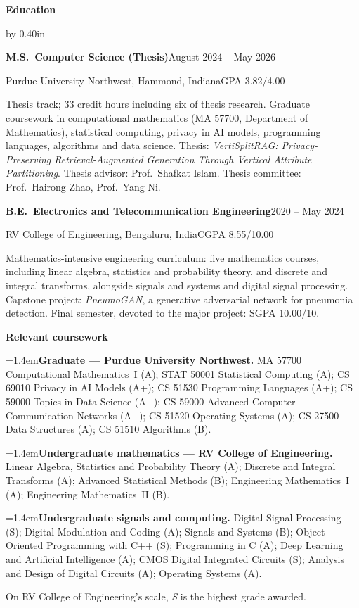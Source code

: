 \documentclass[10pt]{article}
\newcommand{\cvsection}[1]{%
  \vspace{8pt}%
  {\fontsize{11pt}{13pt}\selectfont\textbf{#1}}%
  \par\nobreak\vspace{4pt}%
}
\newenvironment{cvindent}{\par\advance\leftskip by 0.40in}{\par}
\newcommand{\cvrow}[2]{\noindent #1\hfill #2\par}
\newcommand{\cvdesc}[1]{\par #1\par\vspace{5.5pt}}
\newcommand{\cvline}[1]{\par\noindent #1\par\vspace{4pt}}
\newcommand{\cvlab}[2]{\par\noindent\hangindent=1.4em\hangafter=1\textbf{#1} #2\par\vspace{4pt}}
\begin{document}
\cvsection{Education}
\begin{cvindent}

\cvrow{\textbf{M.S.\ Computer Science (Thesis)}}{August 2024 -- May 2026}
\cvrow{Purdue University Northwest, Hammond, Indiana}{GPA 3.82/4.00}
\cvdesc{Thesis track; 33 credit hours including six of thesis research. Graduate coursework in
computational mathematics (MA 57700, Department of Mathematics), statistical computing, privacy in AI
models, programming languages, algorithms and data science. Thesis: \emph{VertiSplitRAG: Privacy-Preserving Retrieval-Augmented Generation Through Vertical Attribute Partitioning}. Thesis advisor: Prof.\ Shafkat Islam.
Thesis committee: Prof.\ Hairong Zhao, Prof.\ Yang Ni.}

\cvrow{\textbf{B.E.\ Electronics and Telecommunication Engineering}}{2020 -- May 2024}
\cvrow{RV College of Engineering, Bengaluru, India}{CGPA 8.55/10.00}
\cvdesc{Mathematics-intensive engineering curriculum: five mathematics courses, including linear algebra,
statistics and probability theory, and discrete and integral transforms, alongside signals and systems
and digital signal processing. Capstone project: \emph{PneumoGAN}, a generative adversarial network for pneumonia detection. Final semester,
devoted to the major project: SGPA 10.00/10.}

\par\vspace{2pt}\noindent\textbf{Relevant coursework}\par\nobreak\vspace{3pt}
\cvlab{Graduate --- Purdue University Northwest.}{MA 57700 Computational Mathematics~I (A); STAT 50001
Statistical Computing (A); CS 69010 Privacy in AI Models (A+); CS 51530 Programming Languages (A+);
CS 59000 Topics in Data Science (A$-$); CS 59000 Advanced Computer Communication Networks (A$-$);
CS 51520 Operating Systems (A); CS 27500 Data Structures (A); CS 51510 Algorithms (B).}
\cvlab{Undergraduate mathematics --- RV College of Engineering.}{Linear Algebra, Statistics and
Probability Theory (A); Discrete and Integral Transforms (A); Advanced Statistical Methods (B);
Engineering Mathematics~I (A); Engineering Mathematics~II (B).}
\cvlab{Undergraduate signals and computing.}{Digital Signal Processing (S); Digital Modulation and
Coding (A); Signals and Systems (B); Object-Oriented Programming with C++ (S); Programming in C (A);
Deep Learning and Artificial Intelligence (A); CMOS Digital Integrated Circuits (S); Analysis and
Design of Digital Circuits (A); Operating Systems (A).}
\cvline{\fontsize{9pt}{11pt}\selectfont On RV College of Engineering's scale, \emph{S} is the highest
grade awarded.}
\end{cvindent}
\end{document}
